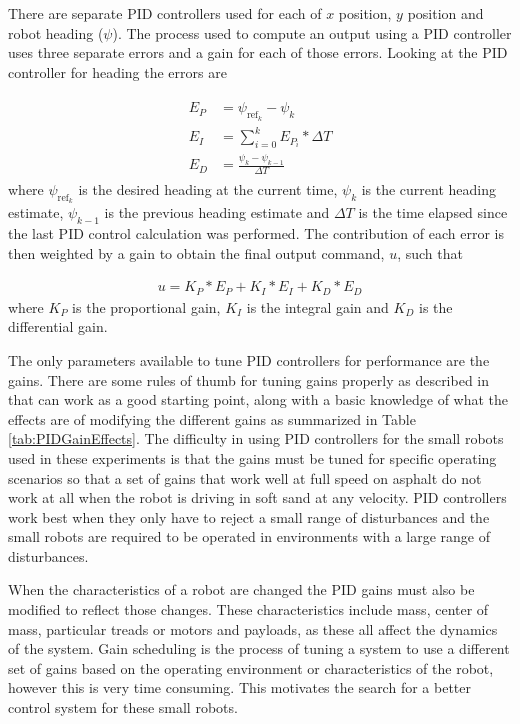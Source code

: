 There are separate PID controllers used for each of $x$ position, $y$ position and robot heading ($\psi$). The process used to compute an output using a PID controller uses three separate errors and a gain for each of those errors. Looking at the PID controller for heading the errors are

\begin{align}
\label{eq:piderrors}
\begin{split}
E_P &= \psi_{\text{ref}_k} - \psi_k \\
E_I &= \sum_{i=0}^{k}E_{P_i}*\Delta T \\
E_D &= \frac{\psi_k - \psi_{k-1}}{\Delta T}
\end{split}
\end{align}
where $\psi_{\text{ref}_k}$ is the desired heading at the current time, $\psi_k$ is the current heading estimate, $\psi_{k-1}$ is the previous heading estimate and $\Delta T$ is the time elapsed since the last PID control calculation was performed. The contribution of each error is then weighted by a gain to obtain the final output command, $u$, such that

\begin{align}
\label{eq:pidcommand}
u = K_P*E_P + K_I*E_I + K_D*E_D
\end{align}
where $K_P$ is the proportional gain, $K_I$ is the integral gain and $K_D$ is the differential gain.

The only parameters available to tune PID controllers for performance are the gains. There are some rules of thumb for tuning gains properly as described in \cite{ZeiglerNichols42} that can work as a good starting point, along with a basic knowledge of what the effects are of modifying the different gains as summarized in Table \ref{tab:PIDGainEffects}. The difficulty in using PID controllers for the small robots used in these experiments is that the gains must be tuned for specific operating scenarios so that a set of gains that work well at full speed on asphalt do not work at all when the robot is driving in soft sand at any velocity. PID controllers work best when they only have to reject a small range of disturbances and the small robots are required to be operated in environments with a large range of disturbances.

When the characteristics of a robot are changed the PID gains must also be modified to reflect those changes. These characteristics include mass, center of mass, particular treads or motors and payloads, as these all affect the dynamics of the system. Gain scheduling is the process of tuning a system to use a different set of gains based on the operating environment or characteristics of the robot, however this is very time consuming. This motivates the search for a better control system for these small robots.

